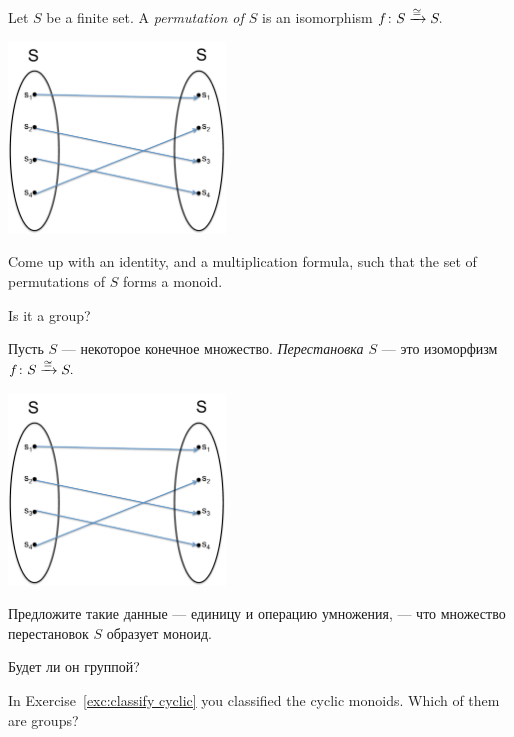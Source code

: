 \documentclass[../main/CT4S-EN-RU]{subfiles}
\begin{document}
\begin{exerciseENG}\label{exc:permutation}
Let $S$ be a finite set. A {\em permutation of $S$} is an isomorphism $f\colon S\xrightarrow{\cong}S.$ 
\begin{center}
\parbox{2.3in}{
\includegraphics[height=2in]{SetPermutation}}
\end{center}
\sexc Come up with an identity, and a  multiplication formula, such that the set of permutations of $S$ forms a monoid. 
\item Is it a group?
\endsexc
\end{exerciseENG}

\begin{exerciseRUS}\label{exc:permutation}
Пусть $S$ — некоторое конечное множество. {\em Перестановка $S$} — это изоморфизм $f\colon S\xrightarrow{\cong}S.$ 
\begin{center}
\parbox{2.3in}{
\includegraphics[height=2in]{SetPermutation}}
\end{center}
\sexc Предложите такие данные — единицу и операцию умножения, — что множество перестановок $S$ образует моноид. 
\item Будет ли он группой?
\endsexc
\end{exerciseRUS}

\begin{exerciseENG}
In Exercise~\ref{exc:classify cyclic} you classified the cyclic monoids. Which of them are groups? 
\end{exerciseENG}
\end{document}
